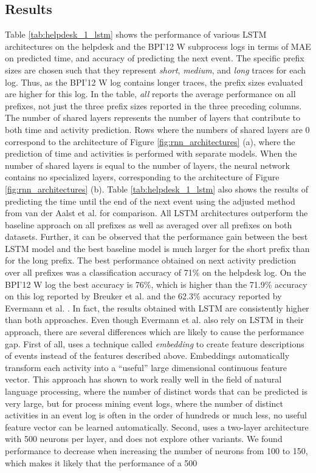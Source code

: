 \documentclass[runningheads,a4paper]{llncs}
\begin{document}
\subsection{Results}
Table \ref{tab:helpdesk_1_lstm} shows the performance of various LSTM architectures on the helpdesk and the BPI'12 W subprocess logs in terms of MAE on predicted time, and accuracy of predicting the next event. The specific prefix sizes are chosen such that they represent \emph{short}, \emph{medium}, and \emph{long} traces for each log. Thus, as the BPI'12 W log contains longer traces, the prefix sizes evaluated are higher for this log. In the table, \emph{all} reports the average performance on all prefixes, not just the three prefix sizes reported in the three preceding columns. The number of shared layers represents the number of layers that contribute to both time and activity prediction. Rows where the numbers of shared layers are $0$ correspond to the architecture of Figure \ref{fig:rnn_architectures} (a), where the prediction of time and activities is performed with separate models. When the number of shared layers is equal to the number of layers, the neural network contains no specialized layers, corresponding to the architecture of Figure \ref{fig:rnn_architectures} (b). Table  \ref{tab:helpdesk_1_lstm} also shows the results of predicting the time until the end of the next event using the adjusted method from van der Aalst et al. \cite{Aalst2011} for comparison. All LSTM architectures outperform the baseline approach on all prefixes as well as averaged over all prefixes on both datasets. Further, it can be observed that the performance gain between the best LSTM model and the best baseline model is much larger for the short prefix than for the long prefix. The best performance obtained on next activity prediction over all prefixes was a classification accuracy of 71\% on the helpdesk log. On the BPI'12 W log the best accuracy is 76\%, which is higher than the 71.9\% accuracy on this log reported by Breuker et al. \cite{Breuker2016} and the 62.3\% accuracy reported by Evermann et al. \cite{Evermann2016}. In fact, the results obtained with LSTM are consistently higher than both approaches. Even though Evermann et al. \cite{Evermann2016} also rely on LSTM in their approach, there are several differences which are likely to cause the performance gap. First of all, \cite{Evermann2016} uses a technique called \emph{embedding} \cite{Mikolov2013} to create feature descriptions of events instead of the features described above. Embeddings automatically transform each activity into a ``useful'' large dimensional continuous feature vector. This approach has shown to work really well in the field of natural language processing, where the number of distinct words that can be predicted is very large, but for process mining event logs, where the number of distinct activities in an event log is often in the order of hundreds or much less, no useful feature vector can be learned automatically. Second, \cite{Evermann2016} uses a two-layer architecture with 500 neurons per layer, and does not explore other variants. We found performance to decrease when increasing the number of neurons from 100 to 150, which makes it likely that the performance of a 500 
\end{document}
